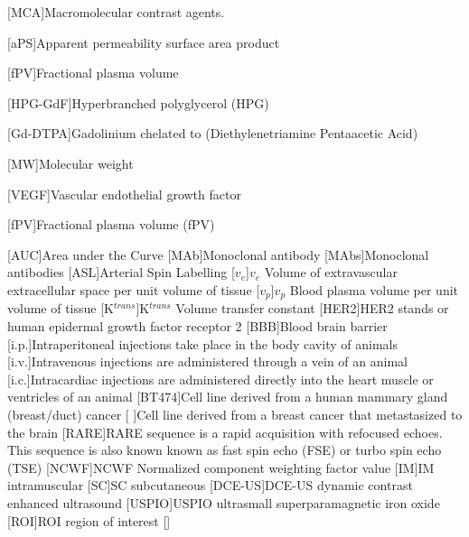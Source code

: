 \begin{acronym}
[MCA]{Macromolecular contrast agents.}

[aPS]{Apparent permeability surface area product}%

[fPV]{Fractional plasma volume}

[HPG-GdF]{Hyperbranched polyglycerol (HPG)}%

[Gd-DTPA]{Gadolinium chelated to (Diethylenetriamine Pentaacetic Acid)}%

[MW]{Molecular weight}

[VEGF]{Vascular endothelial growth factor}

[fPV]{Fractional plasma volume (fPV)}

[AUC]{Area under the Curve}%
[MAb]{Monoclonal antibody}
[MAbs]{Monoclonal antibodies}
[ASL]{Arterial Spin Labelling}
[$v_e$]{$v_e$ Volume of extravascular extracellular space per unit volume of tissue}
[$v_p$]{$v_p$ Blood plasma volume per unit volume of tissue}
[K$^{trans}$]{K$^{trans}$ Volume transfer constant}
[HER2]{HER2 stands or human epidermal growth factor receptor 2}
[BBB]{Blood brain barrier}
[i.p.]{Intraperitoneal injections take place in the body cavity of animals}
[i.v.]{Intravenous injections are administered through a vein of an animal}
[i.c.]{Intracardiac injections are administered directly into the heart muscle or ventricles of an animal}
[BT474]{Cell line derived from a human mammary gland (breast/duct) cancer}
[ ]{Cell line derived from a breast cancer that metastasized to the brain}
[RARE]{RARE sequence is a rapid acquisition with refocused echoes. This sequence is also known known as fast spin echo (FSE) or turbo spin echo (TSE)}
[NCWF]{NCWF Normalized component weighting factor value}
[IM]{IM intramuscular}
[SC]{SC subcutaneous}
[DCE-US]{DCE-US dynamic contrast enhanced ultrasound}
[USPIO]{USPIO ultrasmall superparamagnetic iron oxide}
[ROI]{ROI region of interest}
\acro{}[]{}
\end{acronym}

